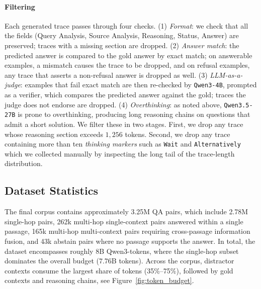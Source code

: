 \documentclass{llmxive}
\begin{document}
\paragraph{Filtering}
Each generated trace passes through four checks. (1) \emph{Format}: we check that all the fields (Query Analysis, Source Analysis, Reasoning, Status, Answer) are preserved; traces with a missing section are dropped. (2) \emph{Answer match}: the predicted answer is compared to the gold answer by exact match; on answerable examples, a mismatch causes the trace to be dropped, and on refusal examples, any trace that asserts a non-refusal answer is dropped as well. (3) \emph{LLM-as-a-judge}: examples that fail exact match are then re-checked by \texttt{Qwen3-4B}, prompted as a verifier, which compares the predicted answer against the gold; traces the judge does not endorse are dropped. (4) \emph{Overthinking}: as noted above, \texttt{Qwen3.5-27B} is prone to overthinking, producing long reasoning chains on questions that admit a short solution. We filter these in two stages. First, we drop any trace whose reasoning section exceeds $1{,}256$ tokens. Second, we drop any trace containing more than ten \emph{thinking markers} such as \texttt{Wait} and \texttt{Alternatively} which we collected manually by inspecting the long tail of the trace-length distribution. 

\subsection{Dataset Statistics}
\label{sec:synth-sh-analysis}

The final corpus contains approximately 3.25M QA pairs, which include 2.78M single-hop pairs, 262k multi-hop single-context pairs answered within a single passage, 165k multi-hop multi-context pairs requiring cross-passage information fusion, and 43k abstain pairs where no passage supports the answer. In total, the dataset encompasses roughly 8B Qwen3-tokens, where the single-hop subset dominates the overall budget (7.76B tokens). Across the corpus, distractor contexts consume the largest share of tokens (35\%--75\%), followed by gold contexts and reasoning chains, see Figure~\ref{fig:token_budget}. 

\end{document}
